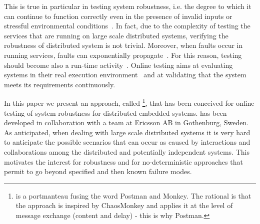 This is true in particular in testing system robustness, i.e. the degree to which it can continue to function correctly even in the presence of invalid inputs or stressful environmental conditions~\cite{STANDARD}.
In fact, due to the complexity of testing the services that are running on large scale distributed systems, verifying the robustness of distributed system is not trivial. %
Moreover, when faults occur in running services, faults can exponentially propagate~\cite{verification_testing}. 
For this reason, testing should become %
also a run-time activity~\cite{towards}. Online testing aims at evaluating systems in their real execution environment~\cite{Bertolino2012} and at validating %
that the system meets its requirements continuously. 


In this paper we present an approach,  called \approach{}\footnote{\approach{} is a portmanteau fusing the word Postman and Monkey. The rational is that the approach is inspired by ChaosMonkey and applies it at the level of message exchange (content and delay) - this is why Postman.}, that has been conceived for online testing of system robustness for distributed embedded systems. \approach{} has been developed in collaboration with a team at Ericsson AB in Gothenburg, Sweden. %
As anticipated, when dealing with large scale distributed systems it is 
very hard to anticipate the possible scenarios that can occur as caused by interactions and collaborations among the distributed and potentially independent systems. This motivates the interest for robustness %
and for no-deterministic approaches that permit to go beyond specified and then known failure modes.

